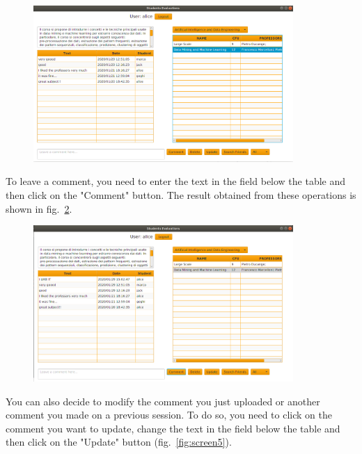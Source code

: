 \documentclass[a4paper]{article}
\begin{document}
\begin{figure}[h]
\centering
\includegraphics[width=0.88\textwidth]{images/screens/screen3}
\label{fig:screen3}
\end{figure}

To leave a comment, you need to enter the text in the field below the table and then click on the "Comment" button. The result obtained from these operations is shown in fig.~\ref{fig:screen4}.
\clearpage
\begin{figure}
\centering
\includegraphics[width=0.88\textwidth]{images/screens/screen4}
\label{fig:screen4}
\end{figure}

You can also decide to modify the comment you just uploaded or another comment you made on a previous session. To do so, you need to click on the comment you want to update, change the text in the field below the table and then click on the "Update" button (fig.~\ref{fig:screen5}).
\end{document}
